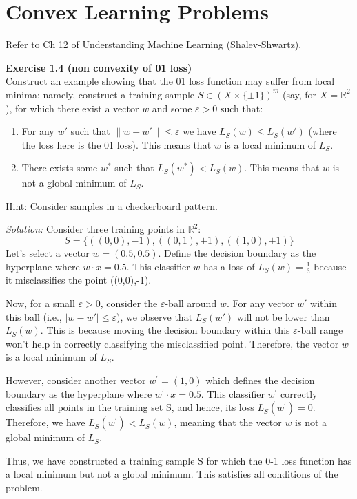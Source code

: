 \documentclass[
	10pt, %
	a4paper, %
	oneside, %
	headinclude,footinclude, %
	BCOR5mm, %
]{scrartcl}
\newenvironment{problem}[2][]
{ \begin{mdframed}[backgroundcolor=gray!20] \textbf{#1 #2} \\}
		{  \end{mdframed}}
\newenvironment{solution}
{\textit{Solution:}}
{}
\begin{document}
\section{Convex Learning Problems}
Refer to Ch 12 of Understanding Machine Learning (Shalev-Shwartz).

\begin{problem}{Exercise 1.4 (non convexity of 0\textendash{}1 loss)}
Construct an example showing that the 0\textendash{}1 loss function may suffer from local minima; namely, construct a training sample $S \in {(X \times \{\pm1\})}^m$ (say, for $X = \mathbb{R}^2$), for which there exist a vector $w$ and some $\varepsilon > 0$ such that:
\begin{enumerate}

	\item For any $w'$ such that $\|w - w'\| \leq \varepsilon$ we have $L_S (w) \leq L_S (w')$ (where the loss here is the 0\textendash{}1 loss). This means that $w$ is a local minimum of $L_S$.
	\item There exists some $w^*$ such that $L_S (w^*) < L_S (w)$. This means that $w$ is not a global minimum of $L_S$.
\end{enumerate}

Hint: Consider samples in a checkerboard pattern.
\end{problem}

\begin{solution}
	Consider three training points in $\mathbb{R}^2$:
	\[
		S = \{((0,0), -1), ((0,1), +1), ((1,0), +1)\}
	\]
	Let's select a vector $w=(0.5,0.5)$. Define the decision boundary as the hyperplane where $w \cdot x = 0.5$. This classifier $w$ has a loss of $L_S(w) = \frac{1}{3}$ because it misclassifies the point ((0,0),-1).

	Now, for a small $\varepsilon > 0$, consider the $\varepsilon$-ball around $w$. For any vector $w'$ within this ball (i.e., $|w - w'| \leq \varepsilon$), we observe that $L_S(w')$ will not be lower than $L_S(w)$. This is because moving the decision boundary within this $\varepsilon$-ball range won't help in correctly classifying the misclassified point. Therefore, the vector $w$ is a local minimum of $L_S$.

	However, consider another vector $w^\prime=(1,0)$ which defines the decision boundary as the hyperplane where $w^\prime \cdot x = 0.5$. This classifier $w^\prime$ correctly classifies all points in the training set S, and hence, its loss $L_S(w^\prime) = 0$. Therefore, we have $L_S(w^\prime) < L_S(w)$, meaning that the vector $w$ is not a global minimum of $L_S$.

	Thus, we have constructed a training sample S for which the 0-1 loss function has a local minimum but not a global minimum. This satisfies all conditions of the problem.
\end{solution}
\end{document}
